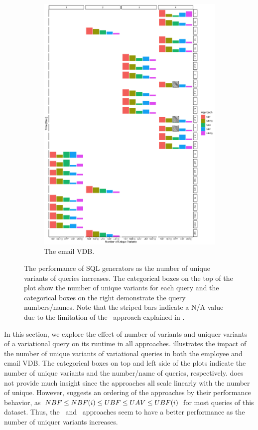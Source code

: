 \begin{figure}
\begin{subfigure}{.6\linewidth}
\includegraphics[width=\textwidth] {figs/plots/enron-comp-var.png}
\caption[The email VDB]{The email VDB.}
\label{fig:enron-var-comp}
\end{subfigure}
\caption[The performance of SQL generators as the number of unique variants of queries increases]{The performance of SQL generators as the number of unique variants of queries increases. The categorical boxes on the top of the plot show the number of
unique variants for each query and the categorical boxes on the right demonstrate the query 
numbers/names. Note that the striped bars indicate a N/A value due to the limitation of the
\uav\ approach explained in .}
\label{fig:var-comp}
\end{figure}


In this section, we explore the effect of number of variants and uniquer variants of a 
variational query on its runtime in all approaches. 
%
 illustrates the impact of the number of unique variants of variational
queries in both the employee and email VDB. 
%
The categorical boxes on top and left side of the plots indicate the number of unique
variants and the number/name of queries, respectively. 
%
 does 
not provide much insight since the approaches all scale linearly with the number of unique.
However,  suggests an ordering of the approaches by their performance behavior, as $NBF \leq NBF(i) \leq UBF \leq UAV \leq UBF(i)$
for most queries of this dataset. Thus, the \uav\ and \ubfi\ approaches seem to have
a better performance as the number of uniquer variants increases. 


